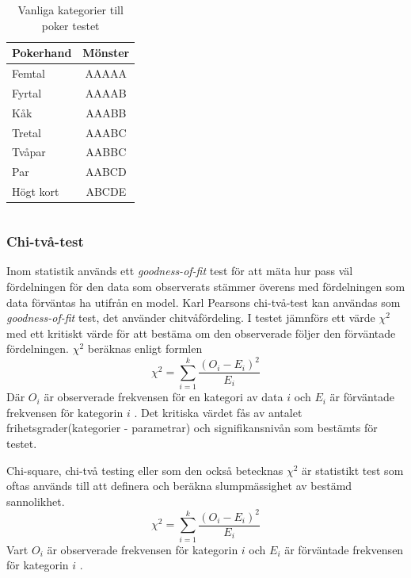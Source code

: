\documentclass[swedish,a4paper]{article}
\begin{document}
\begin{table}[h] %
	\centering
	\begin{tabular}{|l|c|}
	\hline 
	Pokerhand & Mönster \\ \hline  
	Femtal & AAAAA \\ \hline
	Fyrtal & AAAAB \\ \hline
	Kåk & AAABB \\ \hline
	Tretal & AAABC \\ \hline
	Tvåpar & AABBC \\ \hline
	    Par & AABCD \\ \hline
	    Högt kort & ABCDE \\ \hline
	
\end{tabular}
\caption{Vanliga kategorier till poker testet}
\label{tab:num_poker_hands}
\end{table}

 

\begin{equation*}
\end{equation*}

\subsubsection{Chi-två-test}
\label{sec:chi_square}
Inom statistik används ett \textit{goodness-of-fit} test
för att mäta hur pass väl fördelningen för den data som observerats 
stämmer överens med fördelningen som data förväntas ha utifrån en model. 
Karl Pearsons chi-två-test kan användas som \textit{goodness-of-fit} test, 
det använder chitvåfördeling. I testet jämnförs ett värde 
$\chi^2$ med ett kritiskt värde för att bestäma om den observerade
följer den förväntade fördelningen. $\chi^2$ beräknas enligt formlen
$$ \chi^2 = \sum_{i=1}^k \frac{(O_i - E_i)^2}{E_i}$$
Där $O_i$ är observerade frekvensen för en kategori av data $i$ och $E_i$ är förväntade frekvensen för kategorin $i$ \parencite{nist}. Det kritiska värdet 
fås av antalet frihetsgrader(kategorier - parametrar) och signifikansnivån som bestämts för testet.


Chi-square, chi-två testing eller som den också betecknas $\chi^2$ är statistikt test
som oftas används till att definera och beräkna slumpmässighet av bestämd sannolikhet.
$$ \chi^2 = \sum_{i=1}^k \frac{(O_i - E_i)^2}{E_i}$$
Vart $O_i$ är observerade frekvensen för kategorin $i$ och $E_i$ är förväntade
frekvensen för kategorin $i$ \parencite{nist}.
\end{document}
